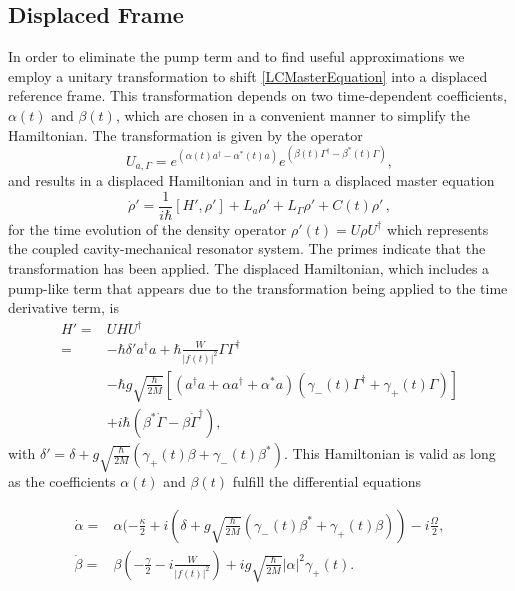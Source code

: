 \documentclass[reprint, amsmath,amssymb, aps,pra]{revtex4-1}
\begin{document}
\subsection{Displaced Frame}

In order to eliminate the pump term and to find useful approximations
we employ a unitary transformation to shift \eqref{LCMasterEquation}
into a displaced reference frame. This transformation depends on two
time-dependent coefficients, $\alpha(t)$ and $\beta(t)$, which are
chosen in a convenient manner to simplify the Hamiltonian. The
transformation is given by the operator
\begin{equation}\label{ShiftTransform}
U_{a,\Gamma} = e^{(\alpha(t) a^\dagger - \alpha^*(t)a)}e^{(\beta(t) \Gamma^\dagger - \beta^*(t)\Gamma)},
\end{equation}
and results in a displaced Hamiltonian and in turn a displaced master
equation
\begin{equation}\label{eq:master_no_small}
\dot{\rho}' = \frac{1}{i\hbar}[H',\rho'] +L_a\rho' + L_\Gamma \rho' + C(t)\rho'\, ,
\end{equation}
for the time evolution of the density operator
$\rho'(t)=U\rho U^\dagger$ which represents the coupled
cavity-mechanical resonator system. The primes indicate that the
transformation has been applied. The displaced Hamiltonian, which
includes a pump-like term that appears due to the transformation being applied to the time derivative term, is
\begin{align}\label{eq:hamiltonian_no_small}
  H'=&U H U^\dagger\nonumber\\=& -\hbar \delta' a^\dagger a + \hbar\frac{W}{|f(t)|^2}\Gamma \Gamma^\dagger\nonumber\\
     &-\hbar g\sqrt{\frac{\hbar}{2M}}[(a^{\dagger}a +\alpha a^{\dagger}+\alpha^* a)(\gamma_-(t)\Gamma^{\dagger}+\gamma_+(t)\Gamma)]\nonumber\\
     &+ i\hbar(\beta^*\dot{\Gamma} - \beta \dot{\Gamma}^\dagger),
\end{align}
with $\delta' = \delta + g\sqrt{\frac{\hbar}{2M}}(\gamma_+(t)\beta + \gamma_-(t)\beta^*)$.
This Hamiltonian is valid as long as the coefficients $\alpha(t)$ and
$\beta(t)$ fulfill the differential equations

\begin{align}\label{eq:displaced_frame}
\dot{\alpha} =& \alpha(-\frac{\kappa}{2}+i(\delta+g\sqrt{\frac{\hbar}{2M}}(\gamma_-(t) \beta^* + \gamma_+(t) \beta))-i\frac{\Omega}{2},\\
\dot{\beta} =& \beta(-\frac{\gamma}{2}-i\frac{W}{|f(t)|^2})+ig\sqrt{\frac{\hbar}{2M}}|\alpha|^2\gamma_+(t).
\end{align}
\end{document}
